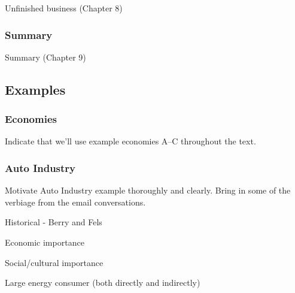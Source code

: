 Unfinished business (Chapter 8)

\subsubsection{Summary}
\label{sec:summary}

Summary (Chapter 9)


\subsection{Examples}

\subsubsection{Economies}

Indicate that we'll use example economies A--C
throughout the text.


\subsubsection{Auto Industry}

Motivate Auto Industry example thoroughly and clearly. 
Bring in some of the verbiage from the email conversations.

Historical - Berry and Fels

Economic importance

Social/cultural importance

Large energy consumer (both directly and indirectly)










%
%

